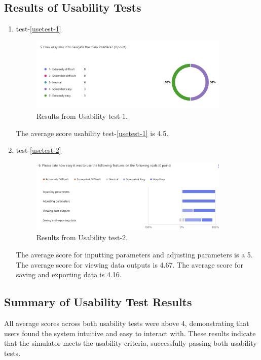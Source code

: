 \documentclass[12pt, titlepage]{article}
\begin{document}
\subsection{Results of Usability Tests}

\begin{enumerate}
  \item test-\ref{usetest-1}
  \begin{figure}[H] 
    \centering
    \includegraphics[width=0.9\textwidth]{use-test1.png} 
    \caption{Results from Usability test-1.}
    \label{fig:myimage}
  \end{figure}
  The average score usability test-\ref{usetest-1} is 4.5.
  \item test-\ref{usetest-2}
  \begin{figure}[H] 
    \centering
    \includegraphics[width=0.9\textwidth]{use-test2.png}  
    \caption{Results from Usability test-2.}
    \label{fig:myimage}
  \end{figure}
  The average score for inputting parameters and adjusting parameters is a 5. The average score for viewing data outputs is 4.67. 
  The average score for saving and exporting data is 4.16.
\end{enumerate}

\subsection{Summary of Usability Test Results}
All average scores across both usability tests were above 4, demonstrating that users found the system intuitive and easy to interact with. 
These results indicate that the simulator meets the usability criteria, successfully passing both usability tests.
\end{document}
